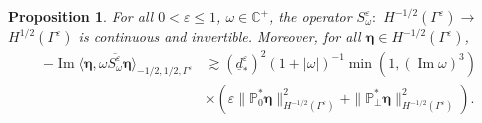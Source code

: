 \documentclass[]{article}
\newtheorem{proposition}{Proposition}
\numberwithin{equation}{section}
\numberwithin{theorem}{section}
\numberwithin{lemma}{section}
\numberwithin{corollary}{section}
\numberwithin{proposition}{section}
\numberwithin{definition}{section}
\newcommand{\re}{\varepsilon}
\renewcommand{\vec}{\boldsymbol}
\renewcommand{\Im}{\operatorname{Im}}
\begin{document}
	\begin{proposition}
		\label{prop:coercivity_bound}
		For all $0<\re\leq 1$, $\omega\in \mathbb{C}^+$, the operator $S^{\re}_{\omega}:$ $ H^{-1/2}(\Gamma^{\re}) \rightarrow$ $H^{1/2}(\Gamma^{\re})$
		is continuous and invertible. Moreover, for all $ \vec{\eta} \in H^{-1/2}(\Gamma^{\re})$,
		\begin{align*}
			-\Im\langle {\vec{\vec{\eta}}}, \overline{ \omega S^{\re}_{\omega} \vec{\vec{\eta}}}\rangle_{-1/2,1/2,\Gamma^{\re}} 
			&\gtrsim (\underline{d}^{\re}_*)^{2} (1+|\omega|)^{-1} \min(1, (\Im \omega)^3)\\
			&\times \left(\re \| \mathbb{P}^*_0 \vec{\eta} \|^2_{H^{-1/2}(\Gamma^{\re})} +  \| \mathbb{P}^*_{\perp} \vec{\eta} \|^2_{H^{-1/2}(\Gamma^{\re})} \right).
		\end{align*} 
	\end{proposition} 
\end{document}

